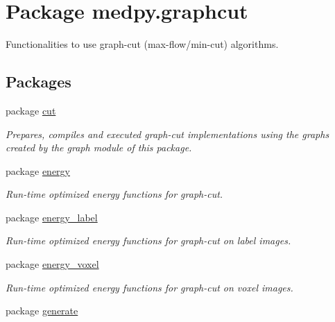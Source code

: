 \hypertarget{namespacemedpy_1_1graphcut}{
\section{Package medpy.graphcut}
\label{namespacemedpy_1_1graphcut}
}


Functionalities to use graph-\/cut (max-\/flow/min-\/cut) algorithms.  


\subsection*{Packages}
\begin{DoxyCompactItemize}
\item 
package \hyperlink{namespacemedpy_1_1graphcut_1_1cut}{cut}


\begin{DoxyCompactList}\small\item\em Prepares, compiles and executed graph-\/cut implementations using the graphs created by the graph module of this package. \end{DoxyCompactList}

\item 
package \hyperlink{namespacemedpy_1_1graphcut_1_1energy}{energy}


\begin{DoxyCompactList}\small\item\em Run-\/time optimized energy functions for graph-\/cut. \end{DoxyCompactList}

\item 
package \hyperlink{namespacemedpy_1_1graphcut_1_1energy__label}{energy\_\-label}


\begin{DoxyCompactList}\small\item\em Run-\/time optimized energy functions for graph-\/cut on label images. \end{DoxyCompactList}

\item 
package \hyperlink{namespacemedpy_1_1graphcut_1_1energy__voxel}{energy\_\-voxel}


\begin{DoxyCompactList}\small\item\em Run-\/time optimized energy functions for graph-\/cut on voxel images. \end{DoxyCompactList}

\item 
package \hyperlink{namespacemedpy_1_1graphcut_1_1generate}{generate}



\end{DoxyCompactItemize}

